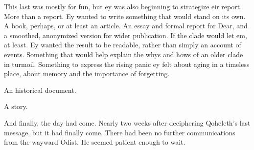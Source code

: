This last was mostly for fun, but ey was also beginning to strategize eir report. More than a report. Ey wanted to write something that would stand on its own. A book, perhaps, or at least an article. An essay and formal report for Dear, and a smoothed, anonymized version for wider publication. If the clade would let em, at least. Ey wanted the result to be readable, rather than simply an account of events. Something that would help explain the whys and hows of an older clade in turmoil. Something to express the rising panic ey felt about aging in a timeless place, about memory and the importance of forgetting.

An historical document.

A story.

And finally, the day had come. Nearly two weeks after deciphering Qoheleth's last message, but it had finally come. There had been no further communications from the wayward Odist. He seemed patient enough to wait.

